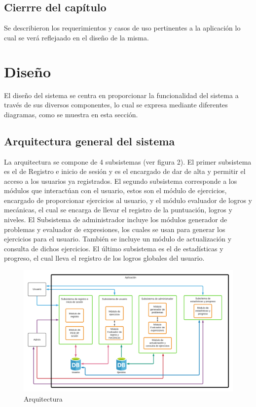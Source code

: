 \documentclass{article}
\begin{document}
\subsection{Cierrre del capítulo}
Se describieron los requerimientos y casos de uso pertinentes a la aplicación lo cual se verá reflejaado en el diseño de la misma.
\pagebreak
\section{Diseño}
El diseño del sistema se centra en proporcionar la funcionalidad del sistema a través de sus diversos componentes, lo cual se expresa mediante diferentes diagramas, como se muestra en esta sección.
\subsection{Arquitectura general del sistema}%
La arquitectura se compone de 4 subsistemas (ver figura 2).  El primer subsistema es el de Registro e inicio de sesión y es el encargado de dar de alta y permitir el acceso a los usuarios ya registrados. El segundo subsistema corresponde a los módulos que interactúan con el usuario, estos son el módulo de ejercicios, encargado de proporcionar ejercicios al usuario, y el módulo evaluador de logros y mecánicas, el cual se encarga de llevar el registro de la puntuación, logros y niveles. El Subsistema de administrador incluye los módulos generador de problemas y evaluador de expresiones, los cuales se usan para generar los ejercicios para el usuario. También se incluye un módulo de actualización y consulta de dichos ejercicios. El último subsistema es el de estadísticas y progreso, el cual lleva el registro de los logros globales del usuario.  
\begin{figure}[H]
    \centering
    \includegraphics[scale=0.65]{imgs/Arquitectura}
    \caption{Arquitectura}
\end{figure}
\end{document}
